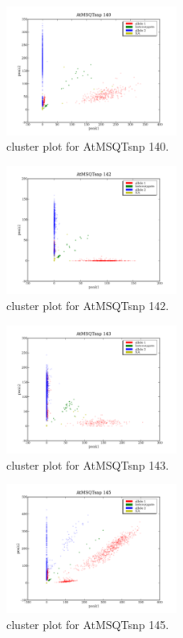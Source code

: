 \begin{figure}[H]
\includegraphics[width=0.5\textwidth]{figures/cluster_plot_AtMSQTsnp_140.png}
\caption{cluster plot for AtMSQTsnp 140.} \label{flAtMSQTsnp140}
\end{figure}
\begin{figure}[H]
\includegraphics[width=0.5\textwidth]{figures/cluster_plot_AtMSQTsnp_142.png}
\caption{cluster plot for AtMSQTsnp 142.} \label{flAtMSQTsnp142}
\end{figure}
\begin{figure}[H]
\includegraphics[width=0.5\textwidth]{figures/cluster_plot_AtMSQTsnp_143.png}
\caption{cluster plot for AtMSQTsnp 143.} \label{flAtMSQTsnp143}
\end{figure}
\begin{figure}[H]
\includegraphics[width=0.5\textwidth]{figures/cluster_plot_AtMSQTsnp_145.png}
\caption{cluster plot for AtMSQTsnp 145.} \label{flAtMSQTsnp145}
\end{figure}
